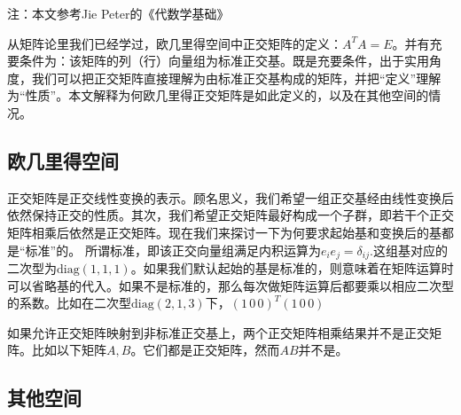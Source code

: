 

\begin{issues}
\issueTODO
\end{issues}

注：本文参考Jie Peter的《代数学基础》

从矩阵论里我们已经学过，欧几里得空间中正交矩阵的定义：$A^T A=E$。并有充要条件为：该矩阵的列（行）向量组为标准正交基。既是充要条件，出于实用角度，我们可以把正交矩阵直接理解为由标准正交基构成的矩阵，并把“定义”理解为“性质”。本文解释为何欧几里得正交矩阵是如此定义的，以及在其他空间的情况。
\subsection{欧几里得空间}
正交矩阵是正交线性变换的表示。顾名思义，我们希望一组正交基经由线性变换后依然保持正交的性质。其次，我们希望正交矩阵最好构成一个子群，即若干个正交矩阵相乘后依然是正交矩阵。现在我们来探讨一下为何要求起始基和变换后的基都是“标准”的。
所谓标准，即该正交向量组满足内积运算为$e_ie_j=\delta_{ij}$.这组基对应的二次型为$\mathrm {diag}(1,1,1)$。如果我们默认起始的基是标准的，则意味着在矩阵运算时可以省略基的代入。如果不是标准的，那么每次做矩阵运算后都要乘以相应二次型的系数。比如在二次型$\mathrm {diag}(2,1,3)$下，$(1\,0\,0)^T (1\,0\,0)$


如果允许正交矩阵映射到非标准正交基上，两个正交矩阵相乘结果并不是正交矩阵。比如以下矩阵$A,B$。它们都是正交矩阵，然而$AB$并不是。

\subsection{其他空间}